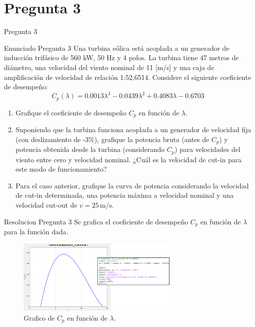 \documentclass[
    10pt,
    aspectratio=169,
    xcolor={dvipsnames},
    spanish,
    ]{beamer}
\begin{document}
\section{Pregunta 3}
\begin{frame}{Pregunta 3}
\begin{block}{Enunciado Pregunta 3}
  Una turbina eólica está acoplada a un generador de inducción trifásico de 560 kW, 50 Hz y 4 polos. La turbina tiene 47 metros de diámetro, una velocidad del viento nominal de 11 [m/s] y una caja de amplificación de velocidad de relación 1:52,6514.
  Considere el siguiente coeficiente de desempeño:
  \[
  C_p(\lambda) = 0.0013 \lambda^3 - 0.0439 \lambda^2 + 0.4083 \lambda - 0.6703
  \]
  \begin{enumerate}
      \item Grafique el coeficiente de desempeño \( C_p \) en función de \( \lambda \).
      
      \item Suponiendo que la turbina funciona acoplada a un generador de velocidad fija (con deslizamiento de -3\%), grafique la potencia bruta (antes de \( C_p \)) y potencia obtenida desde la turbina (considerando \( C_p \)) para velocidades del viento entre cero y velocidad nominal. ¿Cuál es la velocidad de cut-in para este modo de funcionamiento?
      
      \item Para el caso anterior, grafique la curva de potencia considerando la velocidad de cut-in determinada, una potencia máxima a velocidad nominal y una velocidad cut-out de \( v = 25 \, \text{m/s} \).
  \end{enumerate}
  
\end{block}
\end{frame}
\begin{frame}
  \begin{block}{Resolucion Pregunta 3}
  Se grafica el coeficiente de desempeño \( C_p \) en función de \( \lambda \) para la función dada.
  \begin{figure}
    \centering
    \includegraphics[width=0.7\textwidth]{Figure_9.png}
    \caption{Grafico de \( C_p \) en función de \( \lambda \).}
  \end{figure}
\end{block}
\end{frame}
\end{document}
